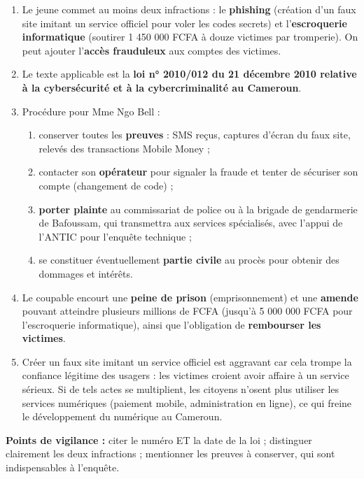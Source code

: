 \documentclass[11pt]{article}
\begin{document}
\begin{corrige}
\begin{enumerate}
\item Le jeune commet au moins deux infractions : le \textbf{phishing} (création d'un faux site imitant un service officiel pour voler les codes secrets) et l'\textbf{escroquerie informatique} (soutirer 1 450 000 FCFA à douze victimes par tromperie). On peut ajouter l'\textbf{accès frauduleux} aux comptes des victimes.
\item Le texte applicable est la \textbf{loi n° 2010/012 du 21 décembre 2010 relative à la cybersécurité et à la cybercriminalité au Cameroun}.
\item Procédure pour Mme Ngo Bell :
\begin{enumerate}
\item conserver toutes les \textbf{preuves} : SMS reçus, captures d'écran du faux site, relevés des transactions Mobile Money ;
\item contacter son \textbf{opérateur} pour signaler la fraude et tenter de sécuriser son compte (changement de code) ;
\item \textbf{porter plainte} au commissariat de police ou à la brigade de gendarmerie de Bafoussam, qui transmettra aux services spécialisés, avec l'appui de l'ANTIC pour l'enquête technique ;
\item se constituer éventuellement \textbf{partie civile} au procès pour obtenir des dommages et intérêts.
\end{enumerate}
\item Le coupable encourt une \textbf{peine de prison} (emprisonnement) et une \textbf{amende} pouvant atteindre plusieurs millions de FCFA (jusqu'à 5 000 000 FCFA pour l'escroquerie informatique), ainsi que l'obligation de \textbf{rembourser les victimes}.
\item Créer un faux site imitant un service officiel est aggravant car cela trompe la confiance légitime des usagers : les victimes croient avoir affaire à un service sérieux. Si de tels actes se multiplient, les citoyens n'osent plus utiliser les services numériques (paiement mobile, administration en ligne), ce qui freine le développement du numérique au Cameroun.
\end{enumerate}
\textbf{Points de vigilance :} citer le numéro ET la date de la loi ; distinguer clairement les deux infractions ; mentionner les preuves à conserver, qui sont indispensables à l'enquête.
\end{corrige}
\end{document}
